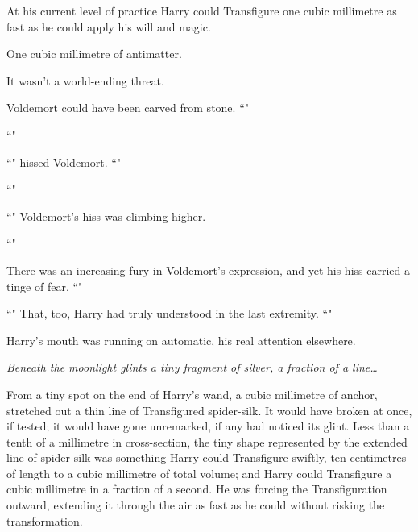 At his current level of practice Harry could Transfigure one cubic millimetre as fast as he could apply his will and magic.

One cubic millimetre of antimatter.

It wasn't a world-ending threat.

Voldemort could have been carved from stone. ``"

``"

``" hissed Voldemort. ``"

``"

``" Voldemort's hiss was climbing higher.

``"

There was an increasing fury in Voldemort's expression, and yet his hiss carried a tinge of fear. ``"

``" That, too, Harry had truly understood in the last extremity. ``"

Harry's mouth was running on automatic, his real attention elsewhere.

\emph{Beneath the moonlight glints a tiny fragment of silver, a fraction of a line…}

From a tiny spot on the end of Harry's wand, a cubic millimetre of anchor, stretched out a thin line of Transfigured spider-silk. It would have broken at once, if tested; it would have gone unremarked, if any had noticed its glint. Less than a tenth of a millimetre in cross-section, the tiny shape represented by the extended line of spider-silk was something Harry could Transfigure swiftly, ten centimetres of length to a cubic millimetre of total volume; and Harry could Transfigure a cubic millimetre in a fraction of a second. He was forcing the Transfiguration outward, extending it through the air as fast as he could without risking the transformation.


